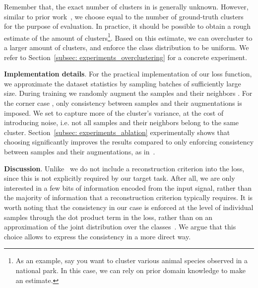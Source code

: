 \documentclass[runningheads]{llncs}
\begin{document}
Remember that, the exact number of clusters in  is generally unknown. However, similar to prior work~\cite{DEC,DAC,IIC}, we choose  equal to the number of ground-truth clusters for the purpose of evaluation. In practice, it should be possible to obtain a rough estimate of the amount of clusters\footnote{As an example, say you want to cluster various animal species observed in a national park. In this case, we can rely on prior domain knowledge to make an estimate.}. Based on this estimate, we can overcluster to a larger amount of clusters, and enforce the class distribution to be uniform. We refer to Section~\ref{subsec: experiments_overclustering} for a concrete experiment. 

\noindent\textbf{Implementation details}. For the practical implementation of our loss function, we approximate the dataset statistics by sampling batches of sufficiently large size. During training we randomly augment the samples  and their neighbors . For the corner case , only consistency between samples and their augmentations is imposed. We set  to capture more of the cluster's variance, at the cost of introducing noise, i.e. not all samples and their neighbors belong to the same cluster. Section~\ref{subsec: experiments_ablation} experimentally shows that choosing  significantly improves the results compared to only enforcing consistency between samples and their augmentations, as in~\cite{IIC,hu2017learning}. 

\noindent\textbf{Discussion}. Unlike~\cite{radford2015unsupervised,kingma2014adam,vincent2010stacked,bengio2007greedy,ng2011sparse,zhao2015stacked,DEC} we do not include a reconstruction criterion into the loss, since this is not explicitly required by our target task. After all, we are only interested in a few bits of information encoded from the input signal, rather than the majority of information that a reconstruction criterion typically requires. It is worth noting that the consistency in our case is enforced at the level of individual samples through the dot product term in the loss, rather than on an approximation of the joint distribution over the classes~\cite{IIC,hu2017learning}. We argue that this choice allows to express the consistency in a more direct way. 
\end{document}
